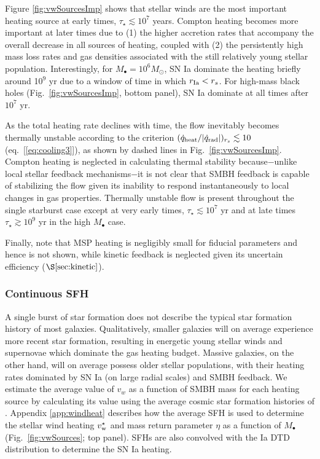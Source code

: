 \documentclass[usenatbib,fleqn]{mn2e}
\newcommand{\rs}{r_s}
\newcommand{\vwO}{v_{w}}
\begin{document}
Figure \ref{fig:vwSourcesImp} shows that stellar winds are the most
important heating source at early times, $\tau_{\star} \lesssim
10^{7}$ years.  Compton heating becomes more important at later times
due to (1) the higher accretion rates that accompany the overall
decrease in all sources of heating, coupled with (2) the persistently
high mass loss rates and gas densities associated with the still
relatively young stellar population.  Interestingly, for $M_{\bullet}
= 10^{6}M_{\odot}$, SN Ia dominate the heating briefly around 10$^{9}$
yr due to a window of time in which $r_{\rm Ia} < \rs$.  For high-mass
black holes (Fig.~\ref{fig:vwSourcesImp}, bottom panel), SN Ia
dominate at all times after $10^{7}$ yr.

As the total heating rate declines with time, the flow inevitably becomes thermally unstable according to the criterion $(\dot{q}_{\rm heat}/|\dot{q}_{\rm rad}|)_{r_{s}} \lesssim 10$
(eq.~[\ref{eq:cooling3}]), as shown by dashed lines in
Fig.~\ref{fig:vwSourcesImp}.  Compton heating is neglected in
calculating thermal stability because$-$unlike local stellar feedback
mechanisms$-$it is not clear that SMBH feedback is capable of stabilizing the
flow given its inability to respond instantaneously to local changes
in gas properties.  Thermally unstable flow is present throughout the single starburst case except at very early times, $\tau_{\star} \lesssim 10^7$ yr and at late times $\tau_{\star}
\gtrsim 10^{9}$ yr in the high $M_{\bullet}$ case.

Finally, note that MSP heating is negligibly small for fiducial parameters and hence
is not shown, while kinetic feedback is neglected given its uncertain efficiency ($\S\ref{sec:kinetic}$).

\subsubsection{Continuous SFH}
A single burst of star formation does not describe the typical star
formation history of most galaxies.  Qualitatively, smaller galaxies
will on average experience more recent star formation, resulting in
energetic young stellar winds and supernovae which dominate the gas
heating budget.  Massive galaxies, on the other hand, will on average
possess older stellar populations, with their heating rates dominated
by SN Ia (on large radial scales) and SMBH feedback.  We estimate the
average value of $\vwO$ as a function of SMBH mass for each heating
source by calculating its value using the average cosmic star
formation histories of \citet{MosterNaab+:2013a}.  Appendix
\ref{app:windheat} describes how the average SFH is
used to determine the stellar wind heating $v_{\rm w}^{\star}$ and
mass return parameter $\eta$ as a function of $M_{\bullet}$
(Fig.~\ref{fig:vwSources}; top panel).  SFHs are also
convolved with the Ia DTD distribution to determine the SN Ia heating.
\end{document}
